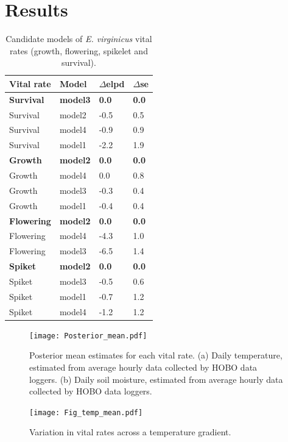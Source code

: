 \documentclass[11pt]{article}
\begin{document}
\section*{Results}
\begin{table}[H]
\caption{Candidate models of  \emph{E. virginicus} vital rates (growth, flowering, spikelet and survival).}
\label{Table:models}
\bigskip{}
\centering
\begin{tabular}{llll}\hline
			    Vital rate   &      Model   &     $\Delta$elpd  &  $\Delta$se     \\ \hline
			 \textbf{Survival} &    \textbf{model3}   &     \textbf{0.0} &     \textbf{ 0.0}    \\
			Survival &     model2  & -0.5 &   0.5       \\
			Survival &   model4    & -0.9    &   0.9\\
			Survival & model1 & -2.2 & 1.9  \\
		     \textbf{Growth} &   \textbf{model2}&  \textbf{0.0} &  \textbf{0.0} \\
		    Growth & model4 & 0.0 &  0.8 \\
		    Growth & model3 & -0.3 &  0.4\\
		    Growth  &  model1& -0.4 & 0.4\\
		     \textbf{Flowering} &   \textbf{model2}&  \textbf{0.0}  &  \textbf{0.0}  \\
		    Flowering & model4 & -4.3 &  1.0\\
		    Flowering & model3 & -6.5 &  1.4\\
		    		     \textbf{Spiket} &   \textbf{model2}&  \textbf{0.0} &  \textbf{0.0}  \\
		    Spiket & model3 & -0.5 &  0.6\\
		    Spiket & model1 & -0.7&  1.2\\
		    Spiket  &  model4 & -1.2 & 1.2\\\hline			    				 			     			     
\end{tabular}
\end{table}

\begin{figure}[H]
\texttt{[image: Posterior\_mean.pdf]}
\caption{Posterior mean estimates for each vital rate. 
(a) Daily temperature, estimated from average hourly data collected by  HOBO data loggers. 
(b) Daily  soil moisture, estimated  from average hourly data  collected by  HOBO data loggers. 
}
\label{fig:climate}
\end{figure}

\begin{figure}[H]
\texttt{[image: Fig\_temp\_mean.pdf]}
\caption{Variation in vital rates across a temperature gradient.
}
\label{fig:vital}
\end{figure}
\end{document}
